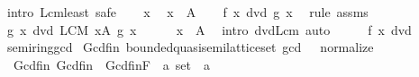 \begin{isabellebody}
%
\isadelimproof
%
\endisadelimproof
%
\isatagproof
{}\isamarkupfalse%
\ {\isacharparenleft}{\kern0pt}intro\ Lcm{\isacharunderscore}{\kern0pt}least{\isacharcomma}{\kern0pt}\ safe{\isacharparenright}{\kern0pt}\isanewline
\ \ \isamarkupfalse%
\ x\ \isamarkupfalse%
\ {\isachardoublequoteopen}x\ {\isasymin}\ A{\isachardoublequoteclose}\isanewline
\ \ \isamarkupfalse%
\ {\isachardoublequoteopen}f\ x\ dvd\ g\ x{\isachardoublequoteclose}\ \isamarkupfalse%
\ {\isacharparenleft}{\kern0pt}rule\ assms{\isacharparenright}{\kern0pt}\isanewline
\ \ \isamarkupfalse%
\ \isamarkupfalse%
\ {\isachardoublequoteopen}g\ x\ dvd\ {\isacharparenleft}{\kern0pt}LCM\ x{\isasymin}A{\isachardot}{\kern0pt}\ g\ x{\isacharparenright}{\kern0pt}{\isachardoublequoteclose}\isanewline
\ \ \ \ \isamarkupfalse%
\ {\isacartoucheopen}x\ {\isasymin}\ A{\isacartoucheclose}\ \isamarkupfalse%
\ {\isacharparenleft}{\kern0pt}intro\ dvd{\isacharunderscore}{\kern0pt}Lcm{\isacharparenright}{\kern0pt}\ auto\isanewline
\ \ \isamarkupfalse%
\ \isamarkupfalse%
\ {\isachardoublequoteopen}f\ x\ dvd\ {\isasymdots}{\isachardoublequoteclose}\ \isacommand{{\isachardot}{\kern0pt}}\isamarkupfalse%
\isanewline
{}\isamarkupfalse%
%
\endisatagproof
{\isafoldproof}%
%
\isadelimproof
\isanewline
%
\endisadelimproof
\isanewline
{}\isamarkupfalse%
%
\isadelimdocument
%
\endisadelimdocument
%
\isatagdocument
%
\isamarkuptrue%
%
\endisatagdocument
{\isafolddocument}%
%
\isadelimdocument
%
\endisadelimdocument
{}\isamarkupfalse%
\ semiring{\isacharunderscore}{\kern0pt}gcd\isanewline
{}\isanewline
\isanewline
{}\isamarkupfalse%
\ Gcd{\isacharunderscore}{\kern0pt}fin{\isacharcolon}{\kern0pt}\ bounded{\isacharunderscore}{\kern0pt}quasi{\isacharunderscore}{\kern0pt}semilattice{\isacharunderscore}{\kern0pt}set\ gcd\ {}\ {}\ normalize\isanewline
{}\isanewline
\ \ Gcd{\isacharunderscore}{\kern0pt}fin\ {\isacharparenleft}{\kern0pt}{\isachardoublequoteopen}Gcd\isactrlsub f\isactrlsub i\isactrlsub n{\isachardoublequoteclose}{\isacharparenright}{\kern0pt}\ {\isacharequal}{\kern0pt}\ {\isachardoublequoteopen}Gcd{\isacharunderscore}{\kern0pt}fin{\isachardot}{\kern0pt}F\ {\isacharcolon}{\kern0pt}{\isacharcolon}{\kern0pt}\ {\isacharprime}{\kern0pt}a\ set\ {\isasymRightarrow}\ {\isacharprime}{\kern0pt}a{\isachardoublequoteclose}%

\end{isabellebody}
